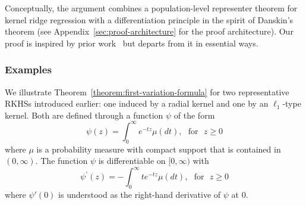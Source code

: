 \documentclass[sn-mathphys-num]{sn-jnl}%
\numberwithin{equation}{section}
\newcommand{\redblock}[1]{{\color{black}#1}}
\newcommand{\profile}{\psi}
\theoremstyle{thmstyleone}%
\theoremstyle{thmstyletwo}%
\theoremstyle{thmstylethree}%
\begin{document}
\redblock{
Conceptually, the argument combines a population-level representer theorem for kernel ridge regression with a differentiation principle in the spirit of Danskin's theorem (see Appendix~\ref{sec:proof-architecture} for the proof architecture). Our proof is inspired by prior work~\cite{LiRu25} but departs from it in essential ways.
}

\subsubsection{Examples} 
We illustrate Theorem~\ref{theorem:first-variation-formula} for two representative RKHSs introduced earlier: 
one induced by a radial kernel and one by an $\ell_1$-type kernel. Both are defined through a function $\profile$ of the form
\begin{equation*}
	\profile(z) = \int_0^\infty e^{-tz} \mu(dt),~~~\text{for}~~~z \ge 0
\end{equation*}
where $\mu$ is a probability measure with compact support that is contained in $(0, \infty)$. The function $\profile$ is 
differentiable on $[0, \infty)$ with 
\begin{equation*}
	\profile^{\prime}(z) = -\int_0^\infty  t e^{-tz} \mu(dt),~~~\text{for}~~~z \ge 0
\end{equation*}
where $\profile'(0)$ is understood as the right-hand derivative of $\psi$ at $0$. 
\end{document}
